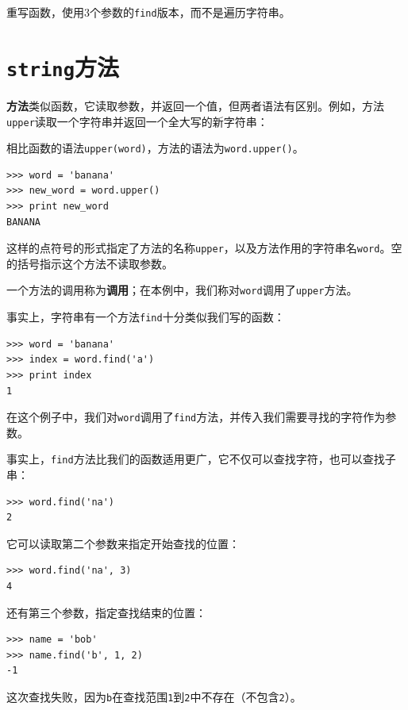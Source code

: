 \begin{ex}
重写函数，使用3个参数的{\tt find}版本，而不是遍历字符串。
\end{ex}


\section{{\tt string}方法}

{\bf 方法}类似函数，它读取参数，并返回一个值，但两者语法有区别。例如，方法{\tt upper}读取一个字符串并返回一个全大写的新字符串：


相比函数的语法{\tt upper(word)}，方法的语法为{\tt word.upper()}。


\beforeverb
\begin{verbatim}
>>> word = 'banana'
>>> new_word = word.upper()
>>> print new_word
BANANA
\end{verbatim}
\afterverb
%
这样的点符号的形式指定了方法的名称{\tt upper}，以及方法作用的字符串名{\tt word}。空的括号指示这个方法不读取参数。


一个方法的调用称为{\bf 调用}；在本例中，我们称对{\tt word}调用了{\tt upper}方法。


事实上，字符串有一个方法{\tt find}十分类似我们写的函数：

\beforeverb
\begin{verbatim}
>>> word = 'banana'
>>> index = word.find('a')
>>> print index
1
\end{verbatim}
\afterverb
%
在这个例子中，我们对{\tt word}调用了{\tt find}方法，并传入我们需要寻找的字符作为参数。

事实上，{\tt find}方法比我们的函数适用更广，它不仅可以查找字符，也可以查找子串：

\beforeverb
\begin{verbatim}
>>> word.find('na')
2
\end{verbatim}
\afterverb
%
它可以读取第二个参数来指定开始查找的位置：


\beforeverb
\begin{verbatim}
>>> word.find('na', 3)
4
\end{verbatim}
\afterverb
%
还有第三个参数，指定查找结束的位置：

\beforeverb
\begin{verbatim}
>>> name = 'bob'
>>> name.find('b', 1, 2)
-1
\end{verbatim}
\afterverb
%
这次查找失败，因为{\tt b}在查找范围{\tt 1}到{\tt 2}中不存在（不包含{\tt 2}）。


